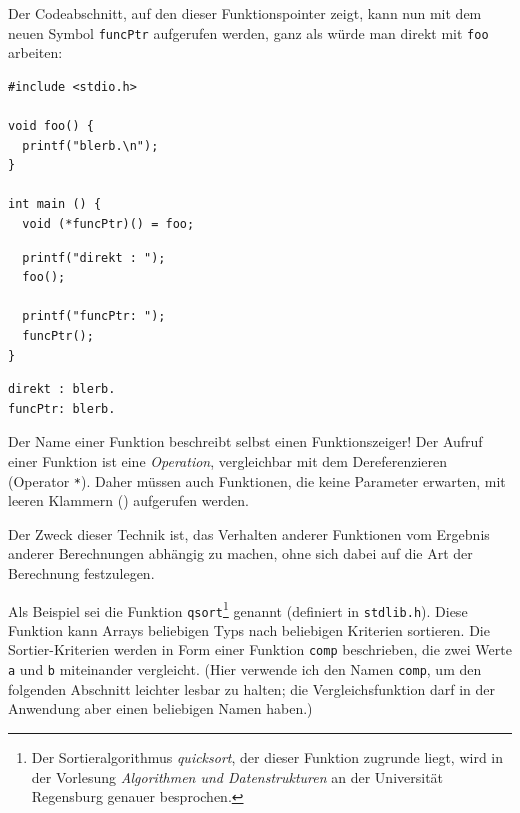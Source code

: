 Der Codeabschnitt, auf den dieser Funktionspointer zeigt, kann nun mit dem neuen Symbol \texttt{funcPtr} aufgerufen werden, ganz als würde man direkt mit \texttt{foo} arbeiten:

\begin{codebox}
\begin{verbatim}
#include <stdio.h>

void foo() {
  printf("blerb.\n");
}

int main () {
  void (*funcPtr)() = foo;
\end{verbatim}
\end{codebox}
%
\begin{codebox}[]
\begin{verbatim}
  printf("direkt : ");
  foo();
  
  printf("funcPtr: ");
  funcPtr();
}
\end{verbatim}
\end{codebox}

\begin{cmdbox}
\begin{verbatim}
direkt : blerb.
funcPtr: blerb.
\end{verbatim}
\end{cmdbox}

\begin{hintbox}
Der Name einer Funktion beschreibt selbst einen Funktionszeiger! Der Aufruf einer Funktion ist eine \emph{Operation}, vergleichbar mit dem Dereferenzieren (Operator \texttt{*}). Daher müssen auch Funktionen, die keine Parameter erwarten, mit leeren Klammern () aufgerufen werden.
\end{hintbox}

Der Zweck dieser Technik ist, das Verhalten anderer Funktionen vom Ergebnis anderer Berechnungen abhängig zu machen, ohne sich dabei auf die Art der Berechnung festzulegen.

Als Beispiel sei die Funktion \texttt{qsort}\footnote{Der Sortieralgorithmus \emph{quicksort}, der dieser Funktion zugrunde liegt, wird in der Vorlesung \emph{Algorithmen und Datenstrukturen} an der Universität Regensburg genauer besprochen.} genannt (definiert in \texttt{stdlib.h}). Diese Funktion kann Arrays beliebigen Typs nach beliebigen Kriterien sortieren. Die Sortier-Kriterien werden in Form einer Funktion \texttt{comp} beschrieben, die zwei Werte \texttt{a} und \texttt{b} miteinander vergleicht. (Hier verwende ich den Namen \texttt{comp}, um den folgenden Abschnitt leichter lesbar zu halten; die Vergleichsfunktion darf in der Anwendung aber einen beliebigen Namen haben.)

